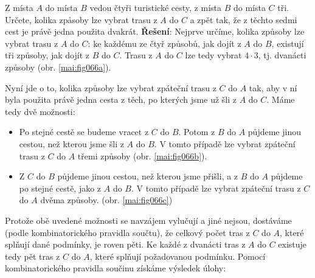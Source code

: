 \begin{mdframed}[style=mdexam]
  \begin{example}\label{mai:exam096}
    Z místa \(A\) do místa \(B\) vedou čtyři turistické cesty, z místa \(B\) do místa \(C\) tři.
    Určete, kolika zpåsoby lze vybrat trasu z \(A\) do \(C\) a zpět tak, že z těchto sedmi cest je
    právě jedna použita dvakrát. \newline
    \textbf{Řešení}: Nejprve určíme, kolika způsoby lze vybrat trasu z \(A\) do \(C\): ke každému ze
    čtyř způsobů, jak dojít z \(A\) do \(B\), existují tři způsoby, jak dojít z \(B\) do \(C\).
    Trasu z \(A\) do \(C\) lze tedy vybrat \(4\cdot3\), tj. dvanácti způsoby (obr.
    \ref{mai:fig066a}).

    {\centering
      \captionsetup{type=figure}
      \captionsetup[subfigure]{justification=centering}
       \newline
      \label{mai:fig066}
    \par}
    
    Nyní jde o to, kolika způsoby lze vybrat zpáteční trasu z \(C\) do \(A\) tak, aby v ní byla
    použita právě jedna cesta z těch, po kterých jsme už šli z \(A\) do \(C\). Máme tedy dvě
    možnosti:
    \begin{itemize}[noitemsep]
      \item Po stejné cestě se budeme vracet z \(C\) do \(B\). Potom z \(B\) do \(A\) půjdeme jinou
            cestou, než kterou jsme šli z \(A\) do \(B\). V tomto případě lze vybrat zpáteční trasu
            z \(C\) do \(A\) třemi způsoby (obr. \ref{mai:fig066b}).
      \item Z \(C\) do \(B\) půjdeme jinou cestou, než kterou jsme přišli, a z \(B\) do \(A\)
            půjdeme po stejné cestě, jako z \(A\) do \(B\). V tomto případě lze vybrat zpáteční
            trasu z \(C\) do \(A\) dvěma způsoby. (obr. \ref{mai:fig066c})
    \end{itemize}
    Protože obě uvedené možnosti se navzájem vylučují a jiné nejsou, dostáváme (podle
    kombinatorického pravidla součtu), že celkový počet tras z \(C\) do \(A\), které splňují dané
    podmínky, je roven pěti. Ke každé z dvanácti tras z \(A\) do \(C\) existuje tedy pět tras z
    \(C\) do \(A\), které splňují požadovanou podmínku. Pomocí kombinatorického pravidla součinu
    získáme výsledek úlohy: 
    

\end{example}
\end{mdframed}
